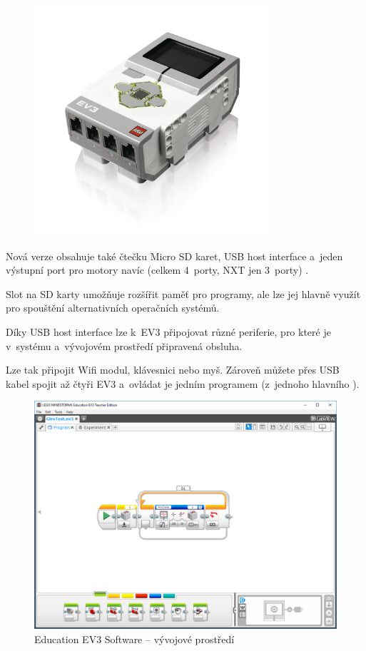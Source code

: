 \begin{figure}[h]
	\centering
	\includegraphics[width=330px]{images/lego-mindstorms-ev3_brick.jpg}
	\caption[]{\legoEV{ \brick}\protect\footnotemark}
	\label{fig:lego-mindstorms-ev3_brick}
\end{figure}


Nová verze obsahuje také čtečku Micro SD karet, USB host interface a~jeden výstupní port pro motory navíc (celkem 4~porty, NXT jen 3~porty) \cite{legoBotBench_comparing-EV3-and-NXT}. 

Slot na SD karty umožňuje rozšířit paměť pro programy, ale lze jej hlavně využít pro spouštění alternativních operačních systémů. 

Díky USB host interface lze k~EV3 připojovat různé periferie, pro které je v~systému a~vývojovém prostředí připravená obsluha.

Lze tak připojit Wifi modul, klávesnici nebo myš. 
Zároveň můžete přes USB kabel spojit až čtyři EV3  a~ovládat je jedním programem (z~jednoho hlavního ).

\begin{figure}[h]
	\centering
	\includegraphics[width=\textwidth]{images/lego-mindstorms-ev3_dev-soft.png}
	\caption[\legoM{ }Education EV3 Software -- vývojové prostředí]{\legoM{ }Education EV3 Software -- vývojové prostředí}
	\label{fig:lego-mindstorms-ev3_dev-soft}
\end{figure}

